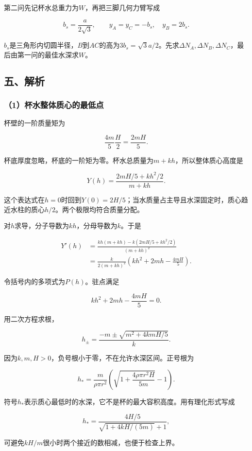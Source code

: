 \documentclass[12pt,a4paper,fontset=fandol]{ctexart}
\begin{document}
第二问先记杯水总重力为\(W\)，再把三脚几何力臂写成

\[
b_s=\frac{a}{2\sqrt3},
\qquad
y_A=y_C=-b_s,\quad y_B=2b_s.
\]

\(b_s\)是三角形内切圆半径，\(B\)到\(AC\)的高为\(3b_s=\sqrt3a/2\)。先求\(\Delta N_A,\Delta N_B,\Delta N_C\)，最后由第一问的最佳水深求\(W\)。

\subsection{五、解析}\label{ux4e94ux89e3ux6790}

\subsubsection{（1）杯水整体质心的最低点}\label{ux676fux6c34ux6574ux4f53ux8d28ux5fc3ux7684ux6700ux4f4eux70b9}

杯壁的一阶质量矩为

\[
\frac{4m}{5}\frac H2=\frac{2mH}{5}.
\]

杯底厚度忽略，杯底的一阶矩为零。杯水总质量为\(m+kh\)，所以整体质心高度是

\[
\boxed{Y(h)=\frac{2mH/5+kh^2/2}{m+kh}}.
\]

这个表达式在\(h=0\)时回到\(Y(0)=2H/5\)；当水质量占主导且水深固定时，质心趋近水柱的质心\(h/2\)。两个极限均符合质量分配。

对\(h\)求导，分子导数为\(kh\)，分母导数为\(k\)。于是

\[
\begin{aligned}
Y'(h)
&=\frac{kh(m+kh)-k(2mH/5+kh^2/2)}
{(m+kh)^2}\\
&=\frac{k}{2(m+kh)^2}
\left(kh^2+2mh-\frac{4mH}{5}\right).
\end{aligned}
\]

令括号内的多项式为\(P(h)\)。驻点满足

\[
kh^2+2mh-\frac{4mH}{5}=0.
\]

用二次方程求根，

\[
h_\pm=\frac{-m\pm\sqrt{m^2+4kmH/5}}{k}.
\]

因为\(k,m,H>0\)，负号根小于零，不在允许水深区间。正号根为

\[
\boxed{
h_*=\frac{m}{\rho\pi r^2}
\left(\sqrt{1+\frac{4\rho\pi r^2H}{5m}}-1\right)}.
\]

符号\(h_*\)表示质心最低时的水深，它不是杯的最大容积高度。用有理化形式写成

\[
h_*=\frac{4H/5}{\sqrt{1+4kH/(5m)}+1},
\]

可避免\(kH/m\)很小时两个接近的数相减，也便于检查上界。
\end{document}
